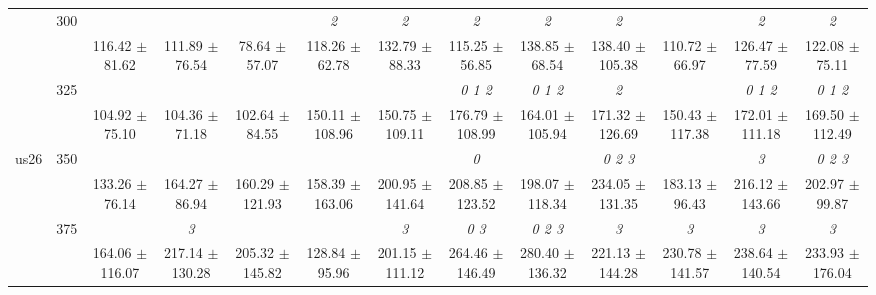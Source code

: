 \begin{table}[h]
{\begin{tabular}{
        ccccccccccccc}
 & \multirow{2}{*}{300}& & & & \textit{ 2 }& \textit{ 2 }& \textit{ 2 }& \textit{ 2 }& \textit{ 2 }& & \textit{ 2 }& \textit{ 2 } \\ 
 & & 116.42 $\pm$ 81.62& 111.89 $\pm$ 76.54& 78.64 $\pm$ 57.07& 118.26 $\pm$ 62.78& 132.79 $\pm$ 88.33& 115.25 $\pm$ 56.85& 138.85 $\pm$ 68.54& 138.40 $\pm$ 105.38& 110.72 $\pm$ 66.97& 126.47 $\pm$ 77.59& 122.08 $\pm$ 75.11 \\ 
 & \multirow{2}{*}{325}& \cellcolor[HTML]{EFEFEF} & \cellcolor[HTML]{EFEFEF} & \cellcolor[HTML]{EFEFEF} & \cellcolor[HTML]{EFEFEF} & \cellcolor[HTML]{EFEFEF} & \cellcolor[HTML]{EFEFEF} \textit{ 0 1 2 }& \cellcolor[HTML]{EFEFEF} \textit{ 0 1 2 }& \cellcolor[HTML]{EFEFEF} \textit{ 2 }& \cellcolor[HTML]{EFEFEF} & \cellcolor[HTML]{EFEFEF} \textit{ 0 1 2 }& \cellcolor[HTML]{EFEFEF} \textit{ 0 1 2 } \\ 
 & & \cellcolor[HTML]{EFEFEF} 104.92 $\pm$ 75.10& \cellcolor[HTML]{EFEFEF} 104.36 $\pm$ 71.18& \cellcolor[HTML]{EFEFEF} 102.64 $\pm$ 84.55& \cellcolor[HTML]{EFEFEF} 150.11 $\pm$ 108.96& \cellcolor[HTML]{EFEFEF} 150.75 $\pm$ 109.11& \cellcolor[HTML]{EFEFEF} 176.79 $\pm$ 108.99& \cellcolor[HTML]{EFEFEF} 164.01 $\pm$ 105.94& \cellcolor[HTML]{EFEFEF} 171.32 $\pm$ 126.69& \cellcolor[HTML]{EFEFEF} 150.43 $\pm$ 117.38& \cellcolor[HTML]{EFEFEF} 172.01 $\pm$ 111.18& \cellcolor[HTML]{EFEFEF} 169.50 $\pm$ 112.49 \\ 
 \multirow{4}{*}{us26} & \multirow{2}{*}{350}& & & & & & \textit{ 0 }& & \textit{ 0 2 3 }& & \textit{ 3 }& \textit{ 0 2 3 } \\ 
 & & 133.26 $\pm$ 76.14& 164.27 $\pm$ 86.94& 160.29 $\pm$ 121.93& 158.39 $\pm$ 163.06& 200.95 $\pm$ 141.64& 208.85 $\pm$ 123.52& 198.07 $\pm$ 118.34& 234.05 $\pm$ 131.35& 183.13 $\pm$ 96.43& 216.12 $\pm$ 143.66& 202.97 $\pm$ 99.87 \\ 
 & \multirow{2}{*}{375}& \cellcolor[HTML]{EFEFEF} & \cellcolor[HTML]{EFEFEF} \textit{ 3 }& \cellcolor[HTML]{EFEFEF} & \cellcolor[HTML]{EFEFEF} & \cellcolor[HTML]{EFEFEF} \textit{ 3 }& \cellcolor[HTML]{EFEFEF} \textit{ 0 3 }& \cellcolor[HTML]{EFEFEF} \textit{ 0 2 3 }& \cellcolor[HTML]{EFEFEF} \textit{ 3 }& \cellcolor[HTML]{EFEFEF} \textit{ 3 }& \cellcolor[HTML]{EFEFEF} \textit{ 3 }& \cellcolor[HTML]{EFEFEF} \textit{ 3 } \\ 
 & & \cellcolor[HTML]{EFEFEF} 164.06 $\pm$ 116.07& \cellcolor[HTML]{EFEFEF} 217.14 $\pm$ 130.28& \cellcolor[HTML]{EFEFEF} 205.32 $\pm$ 145.82& \cellcolor[HTML]{EFEFEF} 128.84 $\pm$ 95.96& \cellcolor[HTML]{EFEFEF} 201.15 $\pm$ 111.12& \cellcolor[HTML]{EFEFEF} 264.46 $\pm$ 146.49& \cellcolor[HTML]{EFEFEF} 280.40 $\pm$ 136.32& \cellcolor[HTML]{EFEFEF} 221.13 $\pm$ 144.28& \cellcolor[HTML]{EFEFEF} 230.78 $\pm$ 141.57& \cellcolor[HTML]{EFEFEF} 238.64 $\pm$ 140.54& \cellcolor[HTML]{EFEFEF} 233.93 $\pm$ 176.04 \\ 

\end{tabular}}
\end{table}
